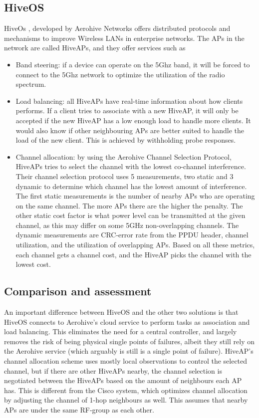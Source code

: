 \subsection{HiveOS}
HiveOs \cite{Aerohive}, developed by Aerohive Networks offers distributed protocols and mechanisms to improve Wireless LANs in enterprise networks. The APs 
in the network are called HiveAPs, and they offer services such as
\begin{itemize}
	\item Band steering: if a device can operate on the 5Ghz band, it will be forced to connect to the 5Ghz network to optimize the utilization of the radio spectrum. 
	\item Load balancing: all HiveAPs have real-time information about how clients performs. If a client tries to associate with a new HiveAP, it will only be accepted
				if the new HiveAP has a low enough load to handle more clients. It would also know if other neighbouring APs are better suited to handle the load of the new client.
				This is achieved by withholding probe responses.

	\item Channel allocation: by using the Aerohive Channel Selection Protocol, HiveAPs tries to select the channel with the lowest co-channel interference. Their channel selection protocol uses 5 measurements, two static and 3 dynamic to determine which channel has the lowest amount of interference.
	The first static measurements is the number of nearby APs who are operating on the same channel. The more APs there are the higher the penalty.
		The other static cost factor is what power level can be transmitted at the given channel, as this may differ on some 5GHz non-overlapping channels.
		The dynamic measurements are CRC-error rate from the PPDU header, channel utilization, and the utilization of overlapping APs. 
		Based on all these metrics, each channel gets a channel cost, and the HiveAP picks the channel with the lowest cost. 


\end{itemize}
\subsection{Comparison and assessment}
		An important difference between HiveOS and the other two solutions is that HiveOS connects to Aerohive's cloud service to perform tasks as association and load balancing.
		This eliminates the need for a central controller, and largely removes the risk of being physical single points of failures, albeit they still rely on the Aerohive service
		(which arguably is still is a single point of failure). 
		HiveAP's channel allocation scheme uses mostly local observations to control the selected channel, but if there are other HiveAPs nearby, the channel selection is negotiated between the HiveAPs
		based on the amount of neighbours each AP has. This is different from the Cisco system, which optimizes channel allocation by adjusting the channel of 1-hop neighbours as well. This
		assumes that nearby APs are under the same RF-group as each other.


